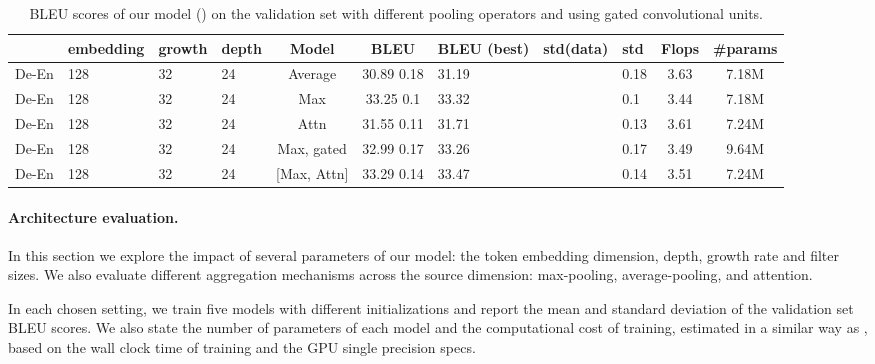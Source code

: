 \documentclass[11pt,a4paper]{article}
\begin{document}
\begin{table}
\begin{center}
{\small
\begin{tabular}{HHHHccHHHcc}
\toprule
              & embedding & growth  & depth & Model      & BLEU                & BLEU (best) & std(data) &  std  & Flops & \#params\\ 
\midrule
De-En         &    128    & 32      & 24    & Average    &  30.89  0.18  &    31.19    &           &  0.18 &     3.63    & 7.18M \\
De-En         &    128    & 32      & 24    & Max        &  33.25  0.1   &    33.32    &           &  0.1  &     3.44    & 7.18M \\ 
De-En         &    128    & 32      & 24    & Attn       &  31.55  0.11   &    31.71    &           &  0.13 &     3.61    & 7.24M \\
De-En         &    128    & 32      & 24    & Max, gated &  32.99  0.17   &    33.26    &           &  0.17 &     3.49    & 9.64M \\
De-En         &    128    & 32      & 24    & [Max, Attn]&  33.29  0.14   &    33.47    &           &  0.14 &     3.51    & 7.24M \\
\bottomrule
\end{tabular}
}
\end{center}
\caption{BLEU scores of our model () on the validation set with different pooling operators and using gated convolutional units.}
\label{tab:ablation}
\end{table}

 
\paragraph{Architecture evaluation.}
In this section we explore the impact of several parameters of our model:  the  token embedding dimension, depth, growth rate and filter sizes. We also evaluate different aggregation mechanisms across the source dimension: max-pooling, average-pooling, and  attention.

In each chosen setting, we train five models with different initializations and report the mean and standard deviation of the validation set BLEU scores. We also state the number of parameters of each model and the computational cost of training, estimated in a similar way as  \citet{vaswani17nips}, based on the wall clock time of training and the GPU single precision specs.
\end{document}
